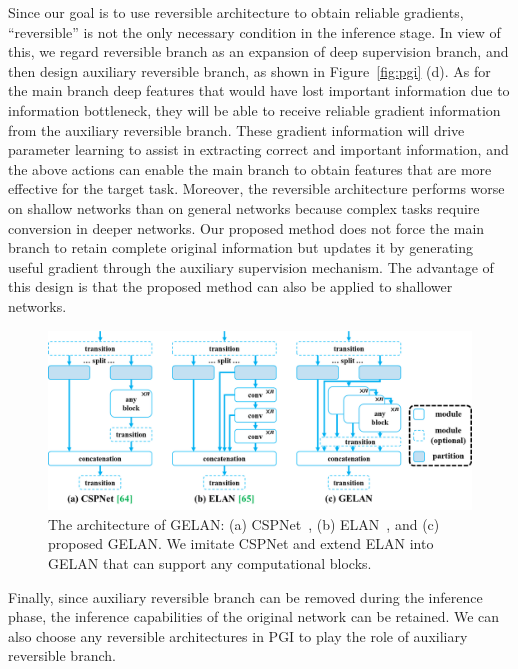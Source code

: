 \documentclass[10pt,twocolumn,letterpaper]{article}
\begin{document}
	Since our goal is to use reversible architecture to obtain reliable gradients, “reversible” is not the only necessary condition in the inference stage.  In view of this, we regard reversible branch as an expansion of deep supervision branch, and then design auxiliary reversible branch, as shown in Figure~\ref{fig:pgi} (d).  As for the main branch deep features that would have lost important information due to information bottleneck, they will be able to receive reliable gradient information from the auxiliary reversible branch. These gradient information will drive parameter learning to assist in extracting correct and important information, and the above actions can enable the main branch to obtain features that are more effective for the target task.  Moreover, the reversible architecture performs worse on shallow networks than on general networks because complex tasks require conversion in deeper networks.  Our proposed method does not force the main branch to retain complete original information but updates it by generating useful gradient through the auxiliary supervision mechanism.  The advantage of this design is that the proposed method can also be applied to shallower networks.
	
	\begin{figure}[t]
		\begin{center}
			\includegraphics[width=.8\linewidth]{figs/gelan}
		\end{center}
		\vspace{-14pt}
		\caption{The architecture of GELAN: (a) CSPNet~\cite{wang2020cspnet}, (b) ELAN~\cite{wang2023designing}, and (c) proposed GELAN.  We imitate CSPNet and extend ELAN into GELAN that can support any computational blocks.}	
		\vspace{-18pt}
		\label{fig:gelan}
	\end{figure}

	\newpage
	
	Finally, since auxiliary reversible branch can be removed during the inference phase, the inference capabilities of the original network can be retained. We can also choose any reversible architectures in PGI to play the role of auxiliary reversible branch.
	
\end{document}
